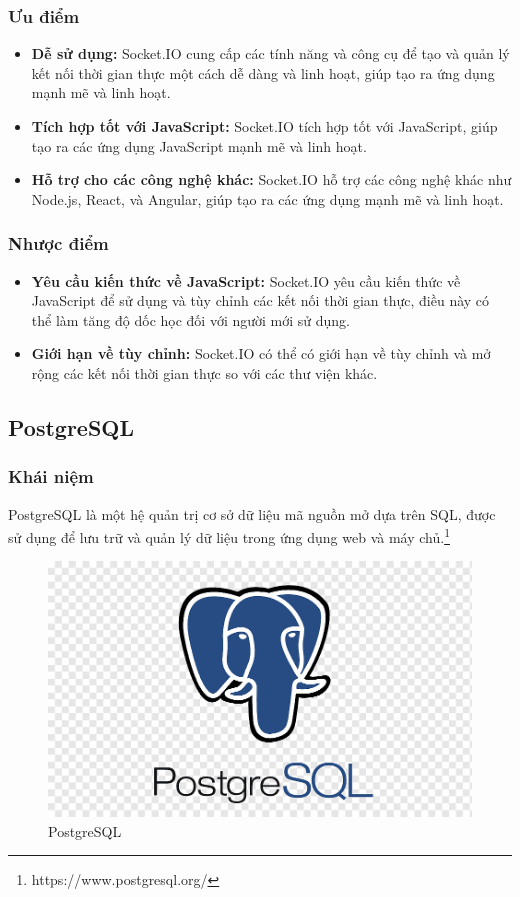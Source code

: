 \subsubsection{Ưu điểm}
\begin{itemize}
  \item \textbf{Dễ sử dụng:} Socket.IO cung cấp các tính năng và công cụ để tạo và quản lý kết nối thời gian thực một cách dễ dàng và linh hoạt, giúp tạo ra ứng dụng mạnh mẽ và linh hoạt.
  \item \textbf{Tích hợp tốt với JavaScript:} Socket.IO tích hợp tốt với JavaScript, giúp tạo ra các ứng dụng JavaScript mạnh mẽ và linh hoạt.
  \item \textbf{Hỗ trợ cho các công nghệ khác:} Socket.IO hỗ trợ các công nghệ khác như Node.js, React, và Angular, giúp tạo ra các ứng dụng mạnh mẽ và linh hoạt.
\end{itemize}
\subsubsection{Nhược điểm}
\begin{itemize}
  \item \textbf{Yêu cầu kiến thức về JavaScript:} Socket.IO yêu cầu kiến thức về JavaScript để sử dụng và tùy chỉnh các kết nối thời gian thực, điều này có thể làm tăng độ dốc học đối với người mới sử dụng.
  \item \textbf{Giới hạn về tùy chỉnh:} Socket.IO có thể có giới hạn về tùy chỉnh và mở rộng các kết nối thời gian thực so với các thư viện khác.
\end{itemize}
\subsection{PostgreSQL}
\subsubsection{Khái niệm}
\noindent PostgreSQL là một hệ quản trị cơ sở dữ liệu mã nguồn mở dựa trên SQL, được sử dụng để lưu trữ và quản lý dữ liệu trong ứng dụng web và máy chủ.\footnote{https://www.postgresql.org/}
\begin{figure}[H]
  \begin{center}
    \includegraphics[scale=0.3]{images/hieu/phuluc/postgresql.png}
    \caption{PostgreSQL}
  \end{center}
\end{figure}
